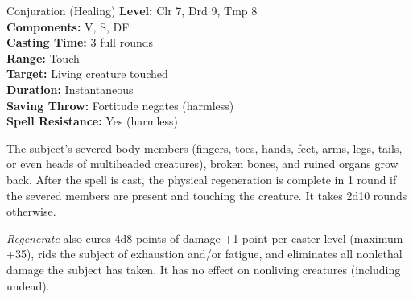 {Conjuration (Healing)}
{
	\textbf{Level:}
	Clr 7, Drd 9, Tmp 8\\
	\textbf{Components:}
	V, S, DF\\
	\textbf{Casting Time:}
	3 full rounds\\
	\textbf{Range:}
	Touch\\
	\textbf{Target:}
	Living creature touched\\
	\textbf{Duration:}
	Instantaneous\\
	\textbf{Saving Throw:}
	Fortitude negates (harmless)\\
	\textbf{Spell Resistance:}
	Yes (harmless)\\
}
{
	The subject's severed body members (fingers, toes, hands, feet, arms, legs, tails, or even heads of multiheaded creatures), broken bones, and ruined organs grow back. After the spell is cast, the physical regeneration is complete in 1 round if the severed members are present and touching the creature. It takes 2d10 rounds otherwise.

	\emph{Regenerate} also cures 4d8 points of damage +1 point per caster level (maximum +35), rids the subject of exhaustion and/or fatigue, and eliminates all nonlethal damage the subject has taken. It has no effect on nonliving creatures (including undead).

}
